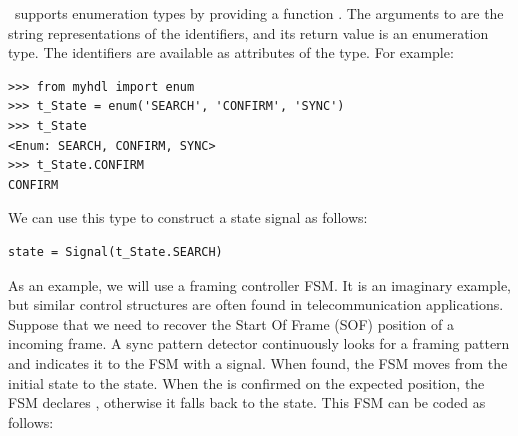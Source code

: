 \myhdl\ supports enumeration types by providing a function
.  The arguments to  are the string
representations of the identifiers, and its return value is an
enumeration type. The identifiers are available as attributes of the
type. For example:

\begin{verbatim}
>>> from myhdl import enum
>>> t_State = enum('SEARCH', 'CONFIRM', 'SYNC')
>>> t_State
<Enum: SEARCH, CONFIRM, SYNC>
>>> t_State.CONFIRM
CONFIRM
\end{verbatim}

We can use this type to construct a state signal as follows:

\begin{verbatim}
state = Signal(t_State.SEARCH)
\end{verbatim}

As an example, we will use a framing controller FSM.  It is an
imaginary example, but similar control structures are often found in
telecommunication applications. Suppose that we need to recover the
Start Of Frame (SOF) position of a incoming frame.
A sync pattern detector continuously looks for a framing
pattern and indicates it to the FSM with a  signal. When
found, the FSM moves from the initial  state to the
 state. When the 
is confirmed on the expected position, the FSM declares ,
otherwise it falls back to the  state.  This FSM can be
coded as follows:

